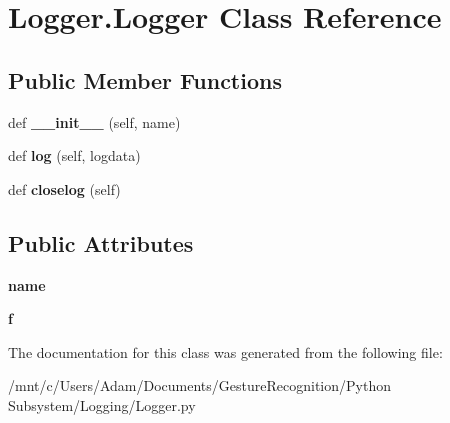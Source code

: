 \hypertarget{classLogger_1_1Logger}{}\section{Logger.\+Logger Class Reference}
\label{classLogger_1_1Logger}
\subsection*{Public Member Functions}
\begin{DoxyCompactItemize}
\item 
\mbox{\label{classLogger_1_1Logger_ace6f80cd04b9dd7e94e5d7fcfef32305}} 
def {\bfseries \+\_\+\+\_\+init\+\_\+\+\_\+} (self, name)
\item 
\mbox{\label{classLogger_1_1Logger_a42a2f4373ea4da023da7d2efea79e58e}} 
def {\bfseries log} (self, logdata)
\item 
\mbox{\label{classLogger_1_1Logger_ae547ee628b2c23311883b5b86a328fcd}} 
def {\bfseries closelog} (self)
\end{DoxyCompactItemize}
\subsection*{Public Attributes}
\begin{DoxyCompactItemize}
\item 
\mbox{\label{classLogger_1_1Logger_a8dccc57c697362592c45977d170c97bb}} 
{\bfseries name}
\item 
\mbox{\label{classLogger_1_1Logger_a07e92059e6338cbc920c7f2f34629c27}} 
{\bfseries f}
\end{DoxyCompactItemize}


The documentation for this class was generated from the following file\+:\begin{DoxyCompactItemize}
\item 
/mnt/c/\+Users/\+Adam/\+Documents/\+Gesture\+Recognition/\+Python Subsystem/\+Logging/Logger.\+py\end{DoxyCompactItemize}
